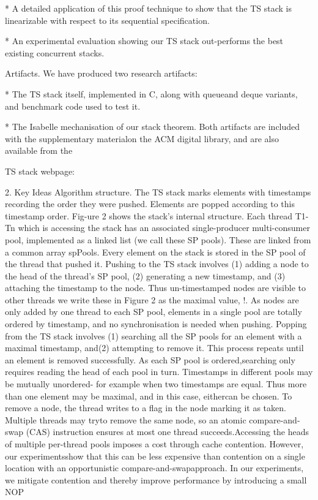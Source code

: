* A detailed application of this proof technique to show that the TS stack is
linearizable with respect to its sequential specification.

* An experimental evaluation showing our TS stack out-performs the best existing
concurrent stacks.

Artifacts. We have produced two research artifacts:

* The TS stack itself, implemented in C, along with queueand deque variants,
and benchmark code used to test it.

* The Isabelle mechanisation of our stack theorem.
Both artifacts are included with the supplementary materialon the ACM digital
library, and are also available from the

TS stack webpage:

2. Key Ideas
Algorithm structure. 
The TS stack marks elements with timestamps recording the order they were
pushed.
Elements are popped according to this timestamp order.
Fig-ure 2 shows the stack's internal structure. 
Each thread T1-Tn which is accessing the stack has an associated
single-producer multi-consumer pool, implemented as a linked list (we call
these SP pools).
These are linked from a common array spPools. 
Every element on the stack is stored in the SP pool of the thread that pushed
it.
Pushing to the TS stack involves (1) adding a node to the head of the thread's
SP pool, (2) generating a new timestamp, and (3) attaching the timestamp to the
node.
Thus un-timestamped nodes are visible to other threads we write these in Figure
2 as the maximal value, !. 
As nodes are only added by one thread to each SP pool, elements in a single pool
are totally ordered by timestamp, and no synchronisation is needed when
pushing.
Popping from the TS stack involves (1) searching all the SP pools for an
element with a maximal timestamp, and(2) attempting to remove it. 
This process repeats until an element is removed successfully. 
As each SP pool
is ordered,searching only requires reading the head of each pool in turn.
Timestamps in different pools may be mutually unordered- for example when two timestamps are equal. Thus more
than one element may be maximal, and in this case, eithercan be chosen. To remove a node, the thread writes to a flag
in the node marking it as taken. Multiple threads may tryto remove the same node, so an atomic compare-and-swap
(CAS) instruction ensures at most one thread succeeds.Accessing the heads of multiple per-thread pools imposes
a cost through cache contention. However, our experimentsshow that this can be less expensive than contention on
a single location with an opportunistic compare-and-swapapproach. In our experiments, we mitigate contention and
thereby improve performance by introducing a small NOP

